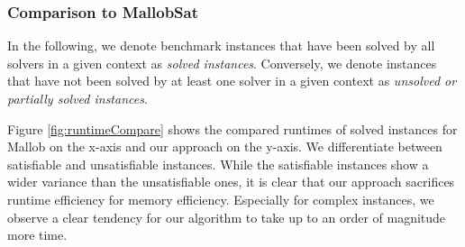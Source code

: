 \documentclass[12pt,a4paper,twoside]{scrartcl}
\numberwithin{equation}{section}
\begin{document}
\subsubsection{Comparison to MallobSat}
\label{sec:compare}

In the following, we denote benchmark instances that have been solved by all solvers in a given context as \textit{solved instances}. Conversely, we denote instances that have not been solved by at least one solver in a given context as \textit{unsolved or partially solved instances}.

Figure \ref{fig:runtimeCompare} shows the compared runtimes of solved instances for Mallob on the x-axis and our approach on the y-axis. We differentiate between satisfiable and unsatisfiable instances. While the satisfiable instances show a wider variance than the unsatisfiable ones, it is clear that our approach sacrifices runtime efficiency for memory efficiency. Especially for complex instances, we observe a clear tendency for our algorithm to take up to an order of magnitude more time.
\end{document}
